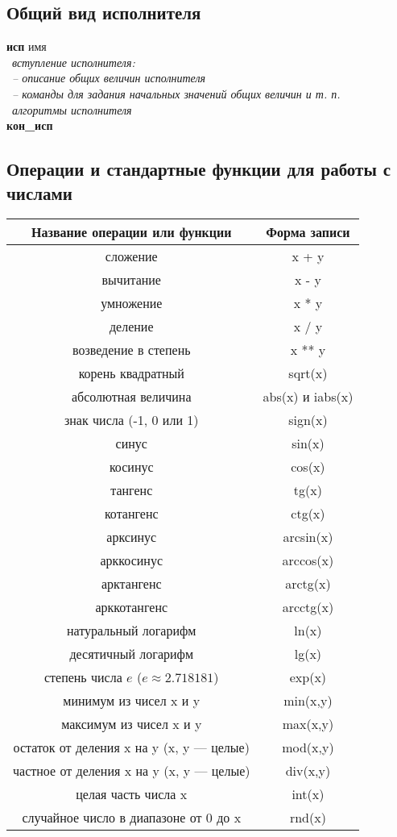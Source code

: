 \documentclass[12pt,a4paper]{article}
\newcommand{\otstup}{\textperiodcentered\ }
\begin{document}
\subsection{Общий вид исполнителя}
{\sffamily
\textbf{исп} имя\\
\otstup \textit{вступление исполнителя:}\\
\otstup \textit{\quad -- описание общих величин исполнителя}\\
\otstup \textit{\quad -- команды для задания начальных значений общих величин и т. п.}\\
\otstup \textit{алгоритмы исполнителя}\\
\textbf{кон\_исп}}

\subsection{Операции и стандартные функции для работы с числами}
\label{standard-operations}
\begin{center}
\begin{tabular}{||c|c||}
\hline
\hline
\textbf{Название операции или функции} &
\textbf{Форма записи} \\
\hline
сложение &
x + y\\
вычитание &
x - y\\
умножение &
x * y\\
деление &
x / y\\
возведение в степень &
x ** y\\
корень квадратный &
sqrt(x) \\
абсолютная величина &
abs(x) и iabs(x)\\
знак числа (-1, 0 или 1) &
sign(x) \\
синус &
sin(x) \\
косинус &
cos(x) \\
тангенс &
tg(x) \\
котангенс &
ctg(x) \\
арксинус &
arcsin(x) \\
арккосинус &
arccos(x) \\
арктангенс &
arctg(x) \\
арккотангенс &
arcctg(x) \\
натуральный логарифм &
ln(x) \\
десятичный логарифм &
lg(x) \\
степень числа $e$ ($e \approx 2.718181$) &
exp(x) \\
минимум из чисел x и y &
min(x,y) \\
максимум из чисел x и y &
max(x,y) \\
остаток от деления x на y (x, y --- целые) &
mod(x,y) \\
частное от деления x на y (x, y --- целые) &
div(x,y) \\
целая часть числа x &
int(x) \\
случайное число в диапазоне от 0 до x &
rnd(x) \\
\hline
\hline
\end{tabular}
\end{center}
\end{document}
